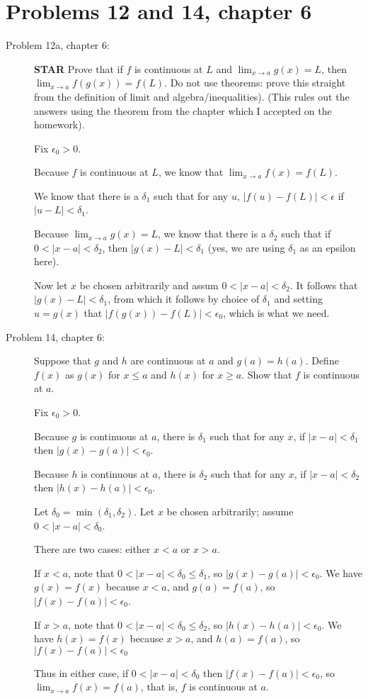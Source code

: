 \documentclass[12pt]{article}
\begin{document}
\section{Problems 12 and 14, chapter 6}

\begin{description}

\item[Problem 12a, chapter 6:]  {\bf STAR}  Prove that if $f$ is continuous at $L$ and $\lim_{x \rightarrow a}g(x)=L$, then $\lim_{x \rightarrow a}{f(g(x))} =f(L)$.  Do not use theorems:  prove this straight from the definition of limit
and algebra/inequalities).  (This rules out the answers using the theorem from the chapter which I accepted on the homework).

Fix $\epsilon_0>0$.

Because $f$ is continuous at $L$, we know that $\lim_{x \rightarrow a}f(x)=f(L)$.

We know that there is a $\delta_1$ such that for any $u$, $|f(u)-f(L)|<\epsilon$ if $|u-L|<\delta_1$.

Because $\lim_{x \rightarrow a}g(x)=L$, we know that there is a $\delta_2$ such that if $0<|x-a|<\delta_2$, then $|g(x)-L|<\delta_1$  (yes, we are using $\delta_1$ as an epsilon here).

Now let $x$ be chosen arbitrarily and assum $0<|x-a|<\delta_2$.  It follows that $|g(x)-L|<\delta_1$, from which it follows by choice of $\delta_1$ and setting $u=g(x)$ that $|f(g(x))-f(L)|<\epsilon_0$, which is what we need.



\item[Problem 14, chapter 6:]  Suppose that $g$ and $h$ are continuous at $a$ and $g(a)=h(a)$.  Define $f(x)$ as $g(x)$ for $x \leq a$ and $h(x)$ for $x \geq a$.  Show that $f$ is continuous at $a$.

Fix $\epsilon_0>0$.

Because $g$ is continuous at $a$, there is $\delta_1$ such that for any $x$,  if $|x-a|<\delta_1$ then $|g(x)-g(a)|<\epsilon_0$.

Because $h$ is continuous at $a$, there is $\delta_2$ such that for any $x$,  if $|x-a|<\delta_2$ then $|h(x)-h(a)|<\epsilon_0$.

Let $\delta_0 = \min(\delta_1,\delta_2)$.  Let $x$ be chosen arbitrarily; assume $0<|x-a|<\delta_0$.

There are two cases:  either $x<a$ or $x>a$.

If $x<a$, note that $0<|x-a|<\delta_0\leq\delta_1$, so $|g(x)-g(a)|<\epsilon_0$.  We have $g(x)=f(x)$ because $x<a$, and $g(a)=f(a)$, so $|f(x)-f(a)|<\epsilon_0$.

If $x>a$, note that $0<|x-a|<\delta_0\leq\delta_2$, so $|h(x)-h(a)|<\epsilon_0$.  We have $h(x)=f(x)$ because $x>a$, and $h(a)=f(a)$, so $|f(x)-f(a)|<\epsilon_0$

Thus in either case, if $0<|x-a|<\delta_0$ then $|f(x)-f(a)|<\epsilon_0$, so $\lim_{x\rightarrow a}f(x)=f(a)$, that is, $f$ is continuous at $a$.

\end{description}
\end{document}
